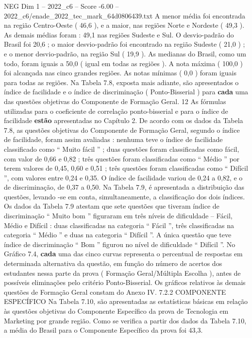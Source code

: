 \begin{textsample}{NEG Dim 1 – 2022\_c6 – Score -6.00 – 2022\_c6/enade\_2022\_tec\_mark\_64d0806439.txt}
A menor média foi encontrada na região Centro-Oeste ( 46,6 ), e a maior, nas regiões Norte e Nordeste ( 49,3 ).
As demais médias foram : 49,1 nas regiões Sudeste e Sul.
O desvio-padrão do Brasil foi 20,6 ; o maior desvio-padrão foi encontrado na região Sudeste ( 21,0 ) ; e o menor desvio-padrão, na região Sul ( 19,9 ).
As medianas do Brasil, como um todo, foram iguais a 50,0 ( igual em todas as regiões ).
A nota máxima ( 100,0 ) foi alcançada nas cinco grandes regiões.
As notas mínimas ( 0,0 ) foram iguais para todas as regiões.
Na Tabela 7.8, exposta mais adiante, são apresentados o índice de facilidade e o índice de discriminação ( Ponto-Bisserial ) para \textbf{cada} uma das questões objetivas do Componente de Formação Geral. 12 As fórmulas utilizadas para o coeficiente de correlação ponto-bisserial e para o índice de facilidade \textbf{estão} apresentadas no Capítulo 2.
De acordo com os dados da Tabela 7.8, as questões objetivas do Componente de Formação Geral, segundo o índice de facilidade, foram assim avaliadas : nenhuma teve o índice de facilidade classificado como “ Muito fácil ” ; duas questões foram classificadas como fácil, com valor de 0,66 e 0,82 ; três questões foram classificadas como “ Médio ” por terem valores de 0,45, 0,60 e 0,51 ; três questões foram classificadas como “ Difícil ”, com valores entre 0,24 e 0,35.
O índice de facilidade variou de 0,24 a 0,82, e o de discriminação, de 0,37 a 0,50.
Na Tabela 7.9, é apresentada a distribuição das questões, levando -se em conta, simultaneamente, a classificação dos dois índices.
Os dados da Tabela 7.9 atestam que sete questões que tiveram índice de discriminação “ Muito bom ” figuraram em três níveis de dificuldade – Fácil, Médio e Difícil : duas classificadas na categoria “ Fácil ”, três classificadas na categoria “ Médio ” e duas na categoria “ Difícil ”.
A única questão que teve índice de discriminação “ Bom ” figurou no nível de dificuldade “ Difícil ”.
No Gráfico 7.4, \textbf{cada} uma das cinco curvas representa o percentual de respostas em determinada alternativa da questão, em função do número de acertos dos estudantes nessa parte da prova ( Formação Geral/Múltipla Escolha ), antes de possíveis eliminações pelo critério Ponto-Bisserial.
Os gráficos relativos às demais questões de Formação Geral constam do Anexo IV. 7.2.2 COMPONENTE ESPECÍFICO Na Tabela 7.10, são apresentadas as estatísticas básicas em relação às questões objetivas do Componente Específico da prova de Tecnologia em Marketing por grande região.
Como se verifica a partir dos dados da Tabela 7.10, a média do Brasil para o Componente Específico da prova foi 43,3.

\end{textsample}
